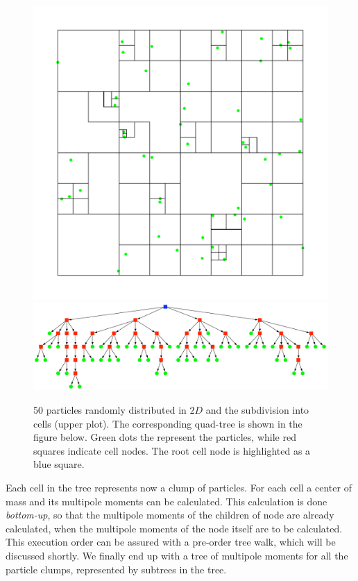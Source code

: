 \begin{figure}[htbp]
\begin{center}
\includegraphics[scale=0.6]{06quadtree50_xy.pdf}
\includegraphics[scale=0.3]{06quadtree50.pdf}
\caption{50 particles randomly distributed in $2D$ and the subdivision into cells (upper plot). The corresponding quad-tree is shown in the figure below. Green dots the represent the particles, while red squares indicate cell nodes. The root cell node is highlighted as a blue square.}
\label{ch02_fig06}
\end{center}
\end{figure}

Each cell in the tree represents now a clump of particles. For each cell a center of mass and its multipole moments can be calculated. This calculation is done \emph{bottom-up}, so that the multipole moments of the children of node are already calculated, when the multipole moments of the node itself are to be calculated. This execution order can be assured with a pre-order tree walk, which will be discussed shortly. We finally end up with a tree of multipole moments for all the particle clumps, represented by subtrees in the tree.

